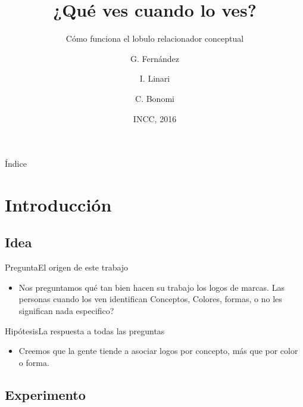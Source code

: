 \documentclass{beamer}
\title{¿Qué ves cuando lo ves?}
\subtitle{Cómo funciona el lobulo relacionador conceptual}
\author{G. Fernández \and I. Linari \and C. Bonomi}
\institute[UBA] %
{
  \inst{1}%
  Departmento de Computación\\
  Universidad de Buenos Aires
  \and
  \inst{2}%
  Department of Theoretical Philosophy\\
  University of Elsewhere}
\date{INCC, 2016}
\begin{document}
\begin{frame}
  \titlepage
\end{frame}

\begin{frame}{Índice}
  \tableofcontents
\end{frame}

\section{Introducción}

\subsection{Idea}

\begin{frame}{Pregunta}{El origen de este trabajo}
  \begin{itemize}
  \item {

    Nos preguntamos qué tan bien hacen su trabajo los logos de marcas. Las personas cuando los ven identifican Conceptos, Colores, formas, o no les significan nada especifico? 

  }

 
  \end{itemize}
\end{frame}

\begin{frame}{Hipótesis}{La respuesta a todas las preguntas}
  \begin{itemize}
  \item {

    Creemos que la gente tiende a asociar logos por concepto, más que por color o forma.

  }

 
  \end{itemize}
\end{frame}

\subsection{Experimento}
\end{document}
